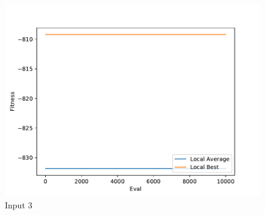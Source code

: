 \documentclass{standalone}
\begin{document}
\begin{figure}[!htb]
	\caption{Input 3}
	\label{fig:graph_3059}
	\includegraphics[width=\textwidth]{../graphs/graphs/3059.pdf}
\end{figure}
\end{document}

